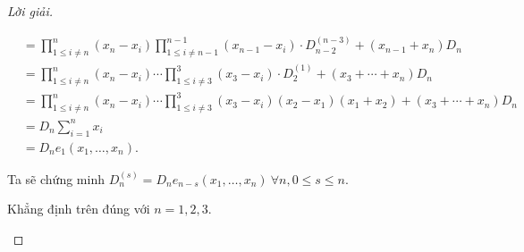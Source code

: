 \begin{proof}[Lời giải]
\begin{enumerate}[label = (\alph*)]
\begin{align*}
                   & = \prod^{n}_{1\le i\ne n}(x_{n} - x_{i})\prod^{n-1}_{1\le i\ne n-1}(x_{n-1} - x_{i})\cdot D^{(n-3)}_{n-2} + (x_{n-1} + x_{n})D_{n}                                                                                              \\
                   & = \prod^{n}_{1\le i\ne n}(x_{n} - x_{i})\cdots \prod^{3}_{1\le i\ne 3}(x_{3} - x_{i})\cdot D^{(1)}_{2} + (x_{3} + \cdots + x_{n})D_{n}                                                                                          \\
                   & = \prod^{n}_{1\le i\ne n}(x_{n} - x_{i})\cdots \prod^{3}_{1\le i\ne 3}(x_{3} - x_{i})(x_{2} - x_{1})(x_{1} + x_{2}) + (x_{3} + \cdots + x_{n})D_{n}                                                                             \\
                   & = D_{n}\sum^{n}_{i=1}x_{i}                                                                                                                                                                                                      \\
                   & = D_{n}e_{1}(x_{1},\ldots, x_{n}).
              \end{align*}

              Ta sẽ chứng minh $D_{n}^{(s)} = D_{n}e_{n-s}(x_{1},\ldots, x_{n})\ \forall n, 0\le s\le n$.
              
              Khẳng định trên đúng với $n = 1, 2, 3$.
              

\end{enumerate}
\end{proof}
